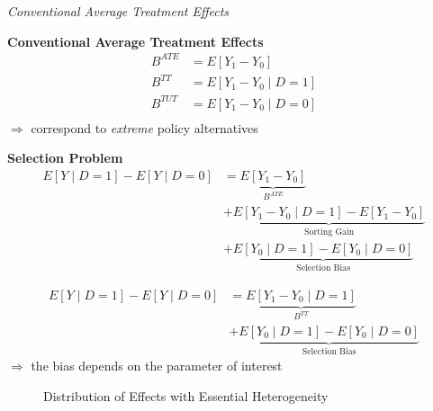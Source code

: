 \begin{frame}\begin{center}
		\LARGE\textit{Conventional Average Treatment Effects}
\end{center}\end{frame}
\begin{frame}
	\textbf{Conventional Average Treatment Effects}
	\begin{align*}
		B^{ATE} & = E[Y_1 - Y_0 ]\\
		B^{TT} & = E[Y_1 - Y_0 \mid D = 1]\\
		B^{TUT} & = E[Y_1 - Y_0 \mid D = 0]\\
	\end{align*}
	\(\Rightarrow\) correspond to \emph{extreme} policy alternatives
\end{frame}
\begin{frame}
	\textbf{Selection Problem}
	\begin{align*}
		E[Y\mid D = 1] - E[Y\mid D = 0] & = \underbrace{E[Y_1 - Y_0]}_{B^{ATE}} \\
		& + \underbrace{E[Y_1 - Y_0 \mid D = 1] - E[Y_1 - Y_0]}_{\text{Sorting Gain}} \\
		& + \underbrace{E[Y_0\mid D = 1] - E[Y_0 \mid D = 0]}_{\text{Selection Bias}}
	\end{align*}
\end{frame}
\begin{frame}
	\begin{align*}
		E[Y\mid D = 1] - E[Y\mid D = 0] & = \underbrace{E[Y_1 - Y_0\mid D = 1]}_{B^{TT}} \\
		& + \underbrace{E[Y_0\mid D= 1]- E[Y_0 \mid D = 0]}_{\text{Selection Bias}}
	\end{align*}
	\(\Rightarrow\) the bias depends on the parameter of interest
\end{frame}
\begin{frame}
	\begin{figure}\caption{Distribution of Effects with Essential Heterogeneity}
	\end{figure}
\end{frame}
